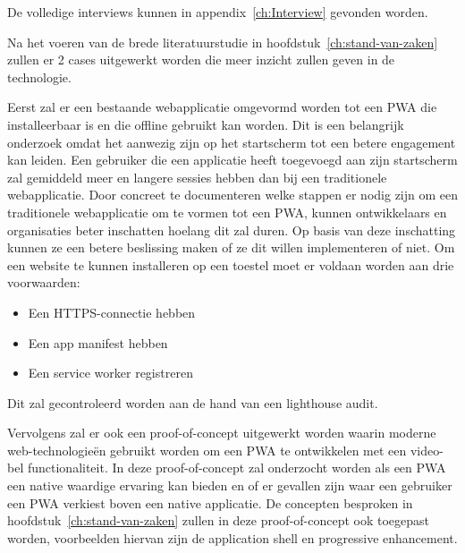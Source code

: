 De volledige interviews kunnen in appendix~\ref{ch:Interview} gevonden worden.

Na het voeren van de brede literatuurstudie in hoofdstuk~\ref{ch:stand-van-zaken} zullen er 2 cases uitgewerkt worden die meer inzicht zullen geven in de technologie.


Eerst zal er een bestaande webapplicatie omgevormd worden tot een PWA die installeerbaar is en die offline gebruikt kan worden.
Dit is een belangrijk onderzoek omdat het aanwezig zijn op het startscherm tot een betere engagement kan leiden. Een gebruiker die een applicatie heeft toegevoegd aan zijn startscherm zal gemiddeld meer en langere sessies hebben dan bij een traditionele webapplicatie.
\autocite{LePage2020b}
Door concreet te documenteren welke stappen er nodig zijn om een traditionele webapplicatie om te vormen tot een PWA, kunnen ontwikkelaars en organisaties beter inschatten hoelang dit zal duren.
Op basis van deze inschatting kunnen ze een betere beslissing maken of ze dit willen implementeren of niet.
Om een website te kunnen installeren op een toestel moet er voldaan worden aan drie voorwaarden:
\begin{itemize}
	\item Een HTTPS-connectie hebben
	\item Een app manifest hebben
	\item Een service worker registreren
\end{itemize}
Dit zal gecontroleerd worden aan de hand van een lighthouse audit.
	

Vervolgens zal er ook een proof-of-concept uitgewerkt worden waarin moderne web-technologieën gebruikt worden om een PWA te ontwikkelen met een video-bel functionaliteit. In deze proof-of-concept zal onderzocht worden als een PWA een native waardige ervaring kan bieden en of er gevallen zijn waar een gebruiker een PWA verkiest boven een native applicatie. De concepten besproken in hoofdstuk~\ref{ch:stand-van-zaken} zullen in deze proof-of-concept ook toegepast worden, voorbeelden hiervan zijn de application shell en  progressive enhancement.


